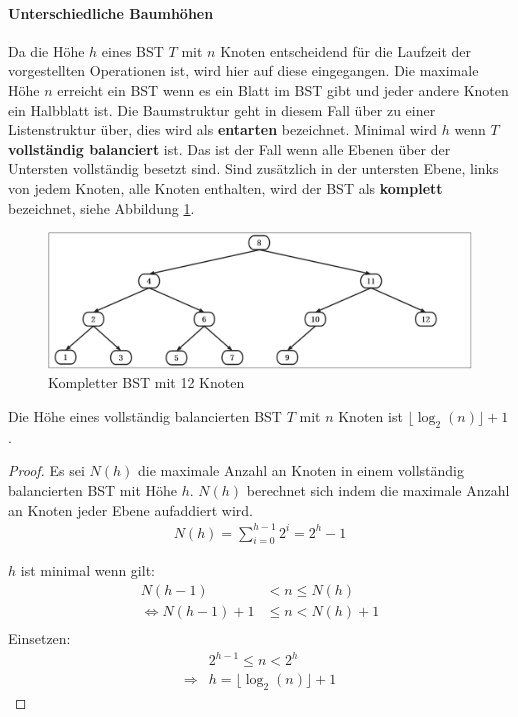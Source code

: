 \documentclass[a4paper,12pt]{article}
\begin{document}
\paragraph{Unterschiedliche Baumhöhen}
Da die Höhe $h$ eines BST $T$ mit $n$ Knoten entscheidend für die Laufzeit der vorgestellten Operationen ist, wird hier auf diese eingegangen. Die maximale Höhe $n$ erreicht ein BST wenn es ein Blatt im BST gibt und jeder andere Knoten ein Halbblatt ist. Die Baumstruktur geht in diesem Fall über zu einer Listenstruktur über, dies wird als \textbf{entarten} bezeichnet. Minimal wird $h$ wenn $T$ \textbf{vollständig balanciert} ist. Das ist der Fall wenn alle Ebenen über der Untersten vollständig besetzt sind. Sind zusätzlich in der untersten Ebene, links von jedem Knoten, alle Knoten enthalten, wird der BST als \textbf{komplett} bezeichnet, siehe Abbildung \ref{fig:kompletterBaum}. 
\begin{figure}[h]
	\centering
	\includegraphics[width= 1\textwidth]{"Medien/Einleitung/kompletterBaum"}
	\caption{Kompletter BST mit 12 Knoten}
	\label{fig:kompletterBaum}
\end{figure}


\begin{Lemma} Die Höhe eines vollständig balancierten BST $T$ mit $n$ Knoten ist $ \lfloor \log_2{(n)} \rfloor + 1 $. 
\end{Lemma}
\begin{proof}
	
	Es sei $\mathit{N(h)}$ die maximale Anzahl an Knoten in einem vollständig balancierten BST mit Höhe $h$.
	$\mathit{N(h)}$  berechnet sich indem die maximale Anzahl an Knoten jeder Ebene aufaddiert wird.\\
	\begin{align*}
	\mathit{N(h)} = \sum\limits_{i=0}^{h-1} 2^i = 2^h - 1 
	\end{align*}
	
	\noindent	$h$ ist minimal wenn gilt:\\
	\begin{align*}
	\mathit{N(h-1)} &< n \leq \mathit{N(h)}\\
	\Leftrightarrow \mathit{N(h-1)} + 1 &\leq n < \mathit{N(h)} + 1\\
	\end{align*}
	Einsetzen:\\
	\begin{align*}
	&2^{h - 1} \leq n < 2^h\\
	\Rightarrow & h =  \lfloor \log_2{(n)} \rfloor + 1
	\end{align*}
	
\end{proof}
\end{document}
